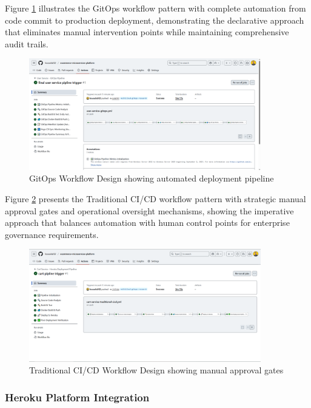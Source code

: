 Figure \ref{fig:gitops-workflow-design} illustrates the GitOps workflow pattern with complete automation from code commit to production deployment, demonstrating the declarative approach that eliminates manual intervention points while maintaining comprehensive audit trails.

\begin{figure}[H]
\centering
\includegraphics[width=0.9\textwidth]{figures/chapter4/gitops-workflow-design.png}
\caption{GitOps Workflow Design showing automated deployment pipeline}
\label{fig:gitops-workflow-design}
\end{figure}

Figure \ref{fig:traditional-cicd-workflow-design} presents the Traditional CI/CD workflow pattern with strategic manual approval gates and operational oversight mechanisms, showing the imperative approach that balances automation with human control points for enterprise governance requirements.

\begin{figure}[H]
\centering
\includegraphics[width=0.9\textwidth]{figures/chapter4/traditional-cicd-workflow-design.png}
\caption{Traditional CI/CD Workflow Design showing manual approval gates}
\label{fig:traditional-cicd-workflow-design}
\end{figure}

\subsubsection{Heroku Platform Integration}

